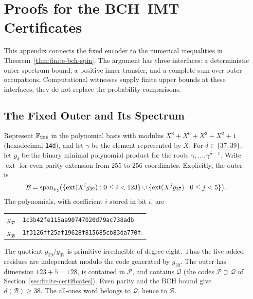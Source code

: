 \section{Proofs for the BCH--IMT Certificates}
\label{app:finite-bch-proof}
\label{app:structured-finite-member}

This appendix connects the fixed encoder to the numerical inequalities in
Theorem~\ref{thm:finite-bch-spin}. The argument has three interfaces: a
deterministic outer spectrum bound, a positive inner transfer, and a complete
sum over outer occupations. Computational witnesses supply finite upper
bounds at these interfaces; they do not replace the probability comparisons.

\subsection{The Fixed Outer and Its Spectrum}
\label{app:finite-bch-definition}

Represent $\mathbb F_{256}$ in the polynomial basis with modulus
$X^8+X^6+X^3+X^2+1$ (hexadecimal \texttt{14d}), and let $\gamma$ be the
element represented by $X$. For $\delta\in\{37,39\}$, let $g_\delta$ be the
binary minimal polynomial product for the roots
$\gamma,\ldots,\gamma^{\delta-1}$. Write $\operatorname{ext}$ for even
parity extension from $255$ to $256$ coordinates. Explicitly, the outer is
\[
 \mathcal B=\operatorname{span}_{\mathbb F_2}
 \bigl(\{\operatorname{ext}(X^i g_{39}):0\le i<123\}
 \cup\{\operatorname{ext}(X^j g_{37}):0\le j<5\}\bigr).
\]
The polynomials, with coefficient $i$ stored in bit $i$, are
\begin{center}
\begin{tabular}{@{}ll@{}}
$g_{37}$ & \texttt{1c3b42fe115aa90747020d79ac738adb}\\
$g_{39}$ & \texttt{1f3126ff25af19628f815685cb83da770f}.
\end{tabular}
\end{center}
The quotient $g_{39}/g_{37}$ is primitive irreducible of degree eight.
Thus the five added residues are independent modulo the code generated by
$g_{39}$. The outer has dimension $123+5=128$, is contained in $\mathcal P$, and
contains $\mathcal Q$ (the codes $\mathcal P\supset\mathcal Q$ of
Section~\ref{sec:finite-certificates}). Even parity and the BCH bound give
$d(\mathcal B)\ge38$. The all-ones word belongs to $\mathcal Q$, hence to $\mathcal B$.

